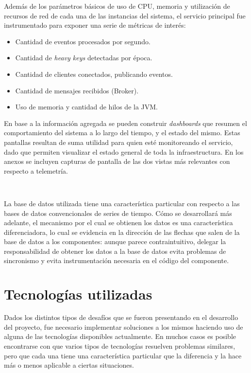 \documentclass[a4paper,12pt, oneside]{article}
\begin{document}
Además de los parámetros básicos de uso de CPU, memoria y utilización de recursos de red de cada una de las instancias del sistema, el servicio principal fue instrumentado para exponer una serie de métricas de interés:

\begin{itemize}
	\item Cantidad de eventos procesados por segundo.
	\item Cantidad de \textit{heavy keys} detectadas por época.
	\item Cantidad de clientes conectados, publicando eventos.
	\item Cantidad de mensajes recibidos (Broker).
	\item Uso de memoria y cantidad de hilos de la JVM.
\end{itemize}

En base a la información agregada se pueden construir \textit{dashboards} que resumen el comportamiento del sistema a lo largo del tiempo, y el estado del mismo. Estas pantallas resultan de suma utilidad para quien esté monitoreando el servicio, dado que permiten visualizar el estado general de toda la infraestructura. En los anexos se incluyen capturas de pantalla de las dos vistas más relevantes con respecto a telemetría.

\

La base de datos utilizada tiene una característica particular con respecto a las bases de datos convencionales de series de tiempo. Cómo se desarrollará más adelante, el mecanismo por el cual se obtienen los datos es una característica diferenciadora, lo cual se evidencia en la dirección de las flechas que salen de la base de datos a los componentes: aunque parece contraintuitivo, delegar la responsabilidad de obtener los datos a la base de datos evita problemas de sincronismo y evita instrumentación necesaria en el código del componente.

\newpage

\section{Tecnologías utilizadas}\label{sec:tecnologias_utilizadas}

Dados los distintos tipos de desafíos que se fueron presentando en el desarrollo del proyecto, fue necesario implementar soluciones a los mismos haciendo uso de alguna de las tecnologías disponibles actualmente. En muchos casos es posible encontrarse con que varios tipos de tecnologías resuelven problemas similares, pero que cada una tiene una característica particular que la diferencia y la hace más o menos aplicable a ciertas situaciones.
\end{document}
